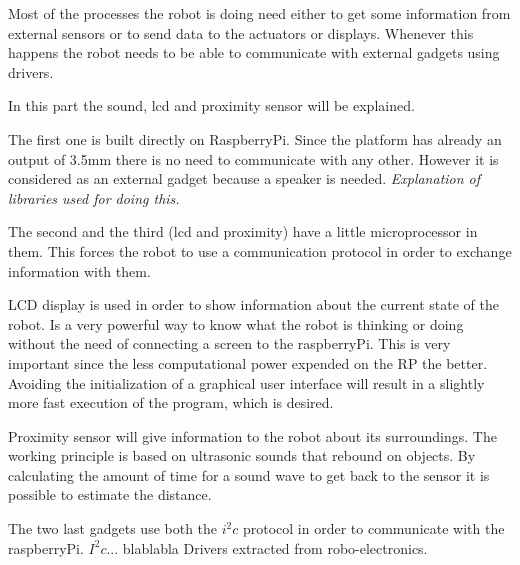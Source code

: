 Most of the processes the robot is doing need either to get some information from external sensors or to send data to the actuators or displays. Whenever this happens the robot needs to be able to communicate with external gadgets using drivers.

In this part the sound, lcd and proximity sensor will be explained.

The first one is built directly on RaspberryPi. Since the platform has already an output of 3.5mm there is no need to communicate with any other. However it is considered as an external gadget because a speaker is needed. \textit{Explanation of libraries used for doing this.}

The second and the third (lcd and proximity) have a little microprocessor in them. This forces the robot to use a communication protocol in order to exchange information with them.

LCD display is used in order to show information about the current state of the robot. Is a very powerful way to know what the robot is thinking or doing without the need of connecting a screen to the raspberryPi. This is very important since the less computational power expended on the RP the better. Avoiding the initialization of a graphical user interface will result in a slightly more fast execution of the program, which is desired.

Proximity sensor will give information to the robot about its surroundings. The working principle is based on ultrasonic sounds that rebound on objects. By calculating the amount of time for a sound wave to get back to the sensor it is possible to estimate the distance.

The two last gadgets use both the $i^{2}c$ protocol in order to communicate with the raspberryPi. $I^{2}c$... blablabla Drivers extracted from robo-electronics.
